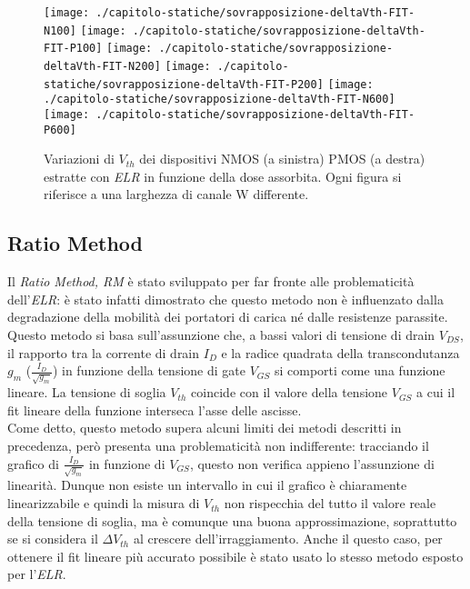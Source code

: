 

\begin{figure}[H]
  \centering
  \texttt{[image: ./capitolo-statiche/sovrapposizione-deltaVth-FIT-N100]}
  \texttt{[image: ./capitolo-statiche/sovrapposizione-deltaVth-FIT-P100]}
  \texttt{[image: ./capitolo-statiche/sovrapposizione-deltaVth-FIT-N200]}
  \texttt{[image: ./capitolo-statiche/sovrapposizione-deltaVth-FIT-P200]}
  \texttt{[image: ./capitolo-statiche/sovrapposizione-deltaVth-FIT-N600]}
  \texttt{[image: ./capitolo-statiche/sovrapposizione-deltaVth-FIT-P600]}
  \caption{Variazioni di $V_{th}$ dei dispositivi NMOS (a sinistra) PMOS (a destra) estratte con \emph{ELR} in funzione della dose assorbita. Ogni figura si riferisce a una larghezza di canale W differente.}
\end{figure}

\subsection[RM]{Ratio Method}
Il \emph{Ratio Method, RM} è stato sviluppato per far fronte alle problematicità dell'\emph{ELR}: è stato infatti dimostrato che questo metodo non è influenzato dalla degradazione della mobilità dei portatori di carica né dalle resistenze parassite\cite{art2}. Questo metodo si basa sull'assunzione che, a bassi valori di tensione di drain $V_{DS}$, il rapporto tra la corrente di drain $I_D$ e la radice quadrata della transcondutanza $g_m$ ($\frac{I_D}{\sqrt{g_m}}$) in funzione della tensione di gate $V_{GS}$ si comporti come una funzione lineare. La tensione di soglia $V_{th}$ coincide con il valore della tensione $V_{GS}$ a cui il fit lineare della funzione interseca l'asse delle ascisse.\\
Come detto, questo metodo supera alcuni limiti dei metodi descritti in precedenza, però presenta una problematicità non indifferente: tracciando il grafico di $\frac{I_D}{\sqrt{g_m}}$ in funzione di $V_{GS}$, questo non verifica appieno l'assunzione di linearità. Dunque non esiste un intervallo in cui il grafico è chiaramente linearizzabile e quindi la misura di $V_{th}$ non rispecchia del tutto il valore reale della tensione di soglia, ma è comunque una buona approssimazione, soprattutto se si considera il $\Delta V_{th}$ al crescere dell'irraggiamento.
Anche il questo caso, per ottenere il fit lineare più accurato possibile è stato usato lo stesso metodo esposto per l'\emph{ELR}.

